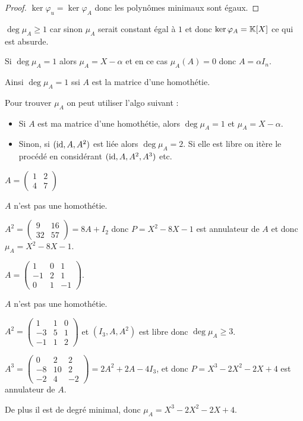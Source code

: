 \begin{proof}
    $\ker \varphi_u = \ker \varphi_A$ donc les polynômes minimaux sont égaux.
\end{proof}

\begin{remarque}
    $\deg \mu_A \geqslant 1$ car sinon $\mu_A$ serait constant égal à $1$ et donc
    $\ker \varphi_A = \mathbb{K}[X]$ ce qui est absurde.

    \avspace Si $\deg \mu_A = 1$ alors $\mu_A = X - \alpha$ et en ce cas 
    $\mu_A(A) = 0$ donc $A = \alpha I_n$.

    Ainsi $\deg \mu_A = 1$ ssi $A$ est la matrice d'une homothétie.

    \avspace Pour trouver $\mu_A$ on peut utiliser l'algo suivant : 
    \begin{itemize}
        \item Si $A$ est ma matrice d'une homothétie, alors $\deg \mu_A = 1$ et $\mu_A = X - \alpha$.
        \item Sinon, si $(\operatorname{id}, A, A^2)$ est liée alors $\deg \mu_A = 2$. Si elle est libre on itère 
            le procédé en considérant $(\operatorname{id}, A, A^2, A^3)$ etc.
    \end{itemize}
\end{remarque}

\begin{exemple}
    $A = \begin{pmatrix}
        1 & 2 \\
        4 & 7
    \end{pmatrix}$

    $A$ n'est pas une homothétie.

    $A^2 = \begin{pmatrix}
        9 & 16 \\
        32 & 57
    \end{pmatrix} = 8 A + I_2$ donc $P = X^2 - 8X - 1$ est annulateur de $A$ et 
    donc $\mu_A = X^2 - 8X - 1$.

    \lvspace $A = \begin{pmatrix}
        1 & 0 & 1 \\
        -1& 2 & 1 \\
        0 & 1 & -1
    \end{pmatrix}$. 

    $A$ n'est pas une homothétie.

    $A^2 = \begin{pmatrix}
        1 & 1 & 0 \\
        -3 & 5 & 1 \\
        -1 & 1 & 2
    \end{pmatrix}$ et $(I_3, A, A^2)$ est libre donc $\deg \mu_A \geqslant 3$.

    $A^3 = \begin{pmatrix}
        0 & 2 & 2 \\
        -8 & 10 & 2 \\
        -2 & 4 & -2
    \end{pmatrix} = 2 A^2 + 2A - 4 I_3$, et donc $P = X^3 - 2X^2 - 2X + 4$ est annulateur de $A$.

    De plus il est de degré minimal, donc $\mu_A = X^3 - 2X^2 - 2X + 4$.
\end{exemple}

